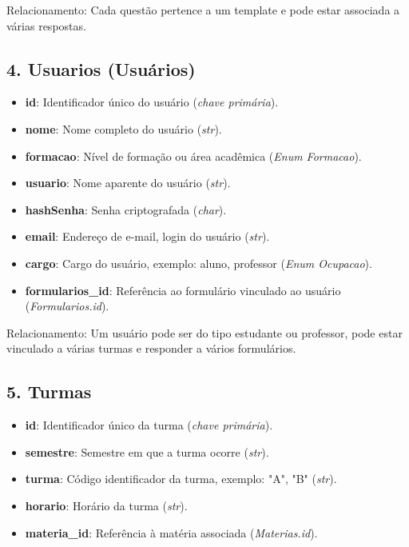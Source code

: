 \documentclass[a4paper,12pt]{article}
\begin{document}
Relacionamento: Cada questão pertence a um template e pode estar associada a várias respostas.

\subsection*{4. Usuarios (Usuários)}

\begin{itemize}

    \item \textbf{id}: Identificador único do usuário (\textit{chave primária}).
    
    \item \textbf{nome}: Nome completo do usuário (\textit{str}).
    
    \item \textbf{formacao}: Nível de formação ou área acadêmica (\textit{Enum Formacao}).
    
    \item \textbf{usuario}: Nome aparente do usuário (\textit{str}).
    
    \item \textbf{hashSenha}: Senha criptografada (\textit{char}).
    
    \item \textbf{email}: Endereço de e-mail, login do usuário (\textit{str}).
    
    \item \textbf{cargo}: Cargo do usuário, exemplo: aluno, professor (\textit{Enum Ocupacao}).
    
    \item \textbf{formularios\_id}: Referência ao formulário vinculado ao usuário (\textit{Formularios.id}).

\end{itemize}

Relacionamento: Um usuário pode ser do tipo estudante ou professor, pode estar vinculado a várias turmas e responder a vários formulários.

\subsection*{5. Turmas}

\begin{itemize}

    \item \textbf{id}: Identificador único da turma (\textit{chave primária}).
    
    \item \textbf{semestre}: Semestre em que a turma ocorre (\textit{str}).
    
    \item \textbf{turma}: Código identificador da turma, exemplo: "A", "B" (\textit{str}).
    
    \item \textbf{horario}: Horário da turma (\textit{str}).
    
    \item \textbf{materia\_id}: Referência à matéria associada (\textit{Materias.id}).


\end{itemize}
\end{document}
